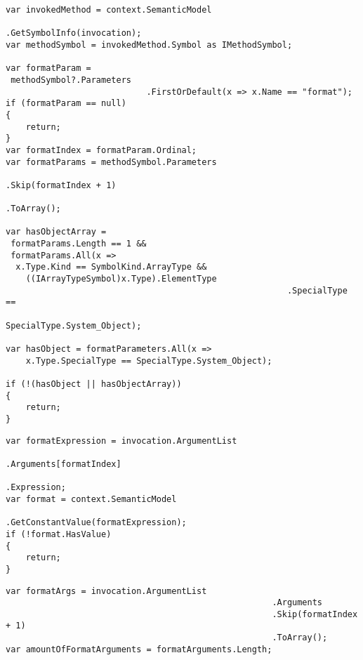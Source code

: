 \begin{minipage}{\linewidth}
\begin{lstlisting}[label={lst:diagnostic-verifying-parameters}]
var invokedMethod = context.SemanticModel
												   .GetSymbolInfo(invocation);
var methodSymbol = invokedMethod.Symbol as IMethodSymbol;

var formatParam = 
 methodSymbol?.Parameters
							.FirstOrDefault(x => x.Name == "format");
if (formatParam == null)
{
	return;
}
var formatIndex = formatParam.Ordinal;
var formatParams = methodSymbol.Parameters
															 .Skip(formatIndex + 1)
															 .ToArray();
																	
var hasObjectArray = 
 formatParams.Length == 1 &&
 formatParams.All(x => 
  x.Type.Kind == SymbolKind.ArrayType && 
	((IArrayTypeSymbol)x.Type).ElementType
														.SpecialType == 
														 SpecialType.System_Object);
																							
var hasObject = formatParameters.All(x => 
	x.Type.SpecialType == SpecialType.System_Object);

if (!(hasObject || hasObjectArray))
{
	return;
}
\end{lstlisting}
\end{minipage}

\begin{minipage}{\linewidth}
\begin{lstlisting}[label={lst:diagnostic-compile-time-constant}]
var formatExpression = invocation.ArgumentList
																 .Arguments[formatIndex]
																 .Expression;
var format = context.SemanticModel
										.GetConstantValue(formatExpression);
if (!format.HasValue)
{
	return;
}
\end{lstlisting}

\begin{lstlisting}[label={lst:diagnostic-extracting-arguments}]
var formatArgs = invocation.ArgumentList
													 .Arguments
													 .Skip(formatIndex + 1)
													 .ToArray();
var amountOfFormatArguments = formatArguments.Length;
\end{lstlisting}
\end{minipage}

